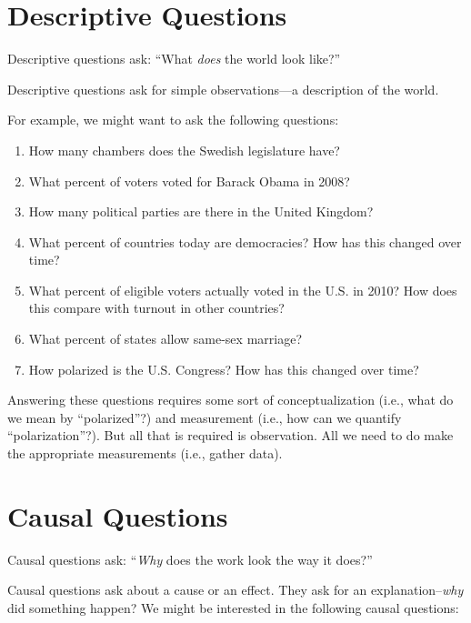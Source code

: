 \documentclass[]{book}
\providecommand{\tightlist}{%
  \setlength{\itemsep}{0pt}\setlength{\parskip}{0pt}}
\theoremstyle{definition}
\theoremstyle{definition}
\theoremstyle{definition}
\theoremstyle{remark}
\begin{document}
\section{Descriptive Questions}\label{descriptive-questions}

Descriptive questions ask: ``What \emph{does} the world look like?''

Descriptive questions ask for simple observations---a description of the
world.

For example, we might want to ask the following questions:

\begin{enumerate}
\def\labelenumi{\arabic{enumi}.}
\tightlist
\item
  How many chambers does the Swedish legislature have?
\item
  What percent of voters voted for Barack Obama in 2008?
\item
  How many political parties are there in the United Kingdom?
\item
  What percent of countries today are democracies? How has this changed
  over time?
\item
  What percent of eligible voters actually voted in the U.S. in 2010?
  How does this compare with turnout in other countries?
\item
  What percent of states allow same-sex marriage?
\item
  How polarized is the U.S. Congress? How has this changed over time?
\end{enumerate}

Answering these questions requires some sort of conceptualization (i.e.,
what do we mean by ``polarized''?) and measurement (i.e., how can we
quantify ``polarization''?). But all that is required is observation.
All we need to do make the appropriate measurements (i.e., gather data).

\section{Causal Questions}\label{causal-questions}

Causal questions ask: ``\emph{Why} does the work look the way it does?''

Causal questions ask about a cause or an effect. They ask for an
explanation--\emph{why} did something happen? We might be interested in
the following causal questions:
\end{document}
